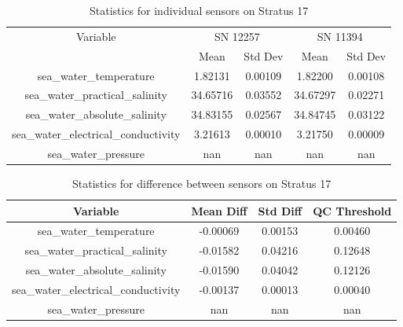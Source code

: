 \begin{table}[h]
\centering
\begin{tabular}{|c|c|c|c|c|}
\hline
Variable & \multicolumn{2}{c|}{SN 12257} & \multicolumn{2}{c|}{SN 11394} \\
& Mean & Std Dev & Mean & Std Dev \\
\hline
sea\_water\_temperature & 1.82131 & 0.00109 & 1.82200 & 0.00108 \\
sea\_water\_practical\_salinity & 34.65716 & 0.03552 & 34.67297 & 0.02271 \\
sea\_water\_absolute\_salinity & 34.83155 & 0.02567 & 34.84745 & 0.03122 \\
sea\_water\_electrical\_conductivity & 3.21613 & 0.00010 & 3.21750 & 0.00009 \\
sea\_water\_pressure & nan & nan & nan & nan \\
\hline
\end{tabular}
\caption{Statistics for individual sensors on Stratus 17}
\end{table}

\begin{table}[h]
\centering
\begin{tabular}{|c|c|c|c|}
\hline
Variable & Mean Diff & Std Diff & QC Threshold \\
\hline
sea\_water\_temperature & -0.00069 & 0.00153 & 0.00460 \\
sea\_water\_practical\_salinity & -0.01582 & 0.04216 & 0.12648 \\
sea\_water\_absolute\_salinity & -0.01590 & 0.04042 & 0.12126 \\
sea\_water\_electrical\_conductivity & -0.00137 & 0.00013 & 0.00040 \\
sea\_water\_pressure & nan & nan & nan \\
\hline
\end{tabular}
\caption{Statistics for difference between sensors on Stratus 17}
\end{table}
